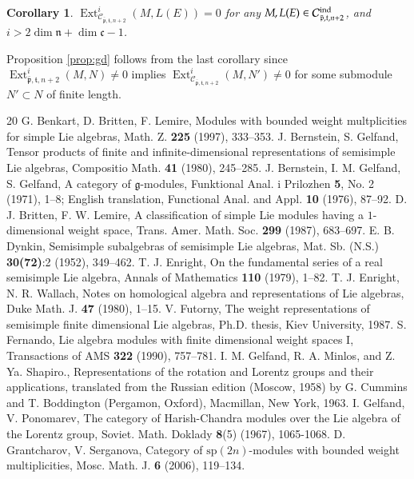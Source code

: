 \documentclass{tglat2e}
\newtheorem{corollary}[theorem]{Corollary}
\theoremstyle{definition}
\theoremstyle{remark}
\newcommand{\cc}{\mathfrak{c}}
\renewcommand{\tt}{\mathfrak{t}}
\newcommand{\nn}{\mathfrak{n}}
\newcommand{\pp}{\mathfrak{p}}
\renewcommand{\gg}{\mathfrak{g}}
\DeclareMathOperator{\Ext}{Ext}
\begin{document}
\begin{corollary} \label{cor:gd2}  $\Ext^i_{\mathcal{C}_{\bar{\pp},\tt,n+2}}(M,L(E))=0$ for any $M, L(E)\in \mathcal C^{\text{\rm ind}}_{\bar{\pp},\tt,n+2}$, and $i>2\dim\nn+\dim\cc -1$. 
\end{corollary}

Proposition \ref{prop:gd} follows from the last corollary since $\Ext^i_{\bar{\pp},\tt,n+2}(M,N)\neq 0$ implies $\Ext^i_{\mathcal{C}_{\bar{\pp},\tt,n+2}}(M,N')\neq 0$ for some submodule
$N'\subset N$ of finite length.

\begin{thebibliography}{20}
 G. Benkart, D. Britten, F. Lemire, {Modules with bounded weight multplicities for simple Lie algebras}, Math. Z. \textbf{225} (1997), 333--353.
 J. Bernstein, S. Gelfand,  Tensor products of finite
and infinite-dimensional representations
of semisimple Lie algebras, {Compositio Math.} \textbf{41}
(1980), 245--285.
 J. Bernstein, I. M. Gelfand, S. Gelfand, {A category of $\gg$-modules}, Funktional Anal. i Prilozhen {\bf5}, No. 2 (1971), 1--8; English translation, Functional Anal. and Appl. {\bf10} (1976), 87--92.
 D. J. Britten, F. W. Lemire, {A classification of simple Lie modules having a $1$-dimensional weight space}, Trans. Amer. Math. Soc. {\bf 299} (1987), 683--697.
 E. B. Dynkin, {Semisimple subalgebras of semisimple Lie algebras}, Mat. Sb. (N.S.) \textbf{30(72)}:2 (1952), 349--462.
 T. J. Enright, {On the fundamental series of a real semisimple Lie algebra}, Annals of Mathematics {\bf 110} (1979), 1--82.
 T. J. Enright, N. R. Wallach, {Notes on homological algebra and representations of Lie algebras}, Duke Math. J. \textbf{47} (1980), 1--15.
 V. Futorny, {The weight representations of semisimple finite dimensional Lie algebras}, Ph.D. thesis, Kiev University, 1987.
  S. Fernando, {Lie algebra modules with finite dimensional weight spaces I}, Transactions of AMS \textbf{322} (1990), 757--781.
 I. M. Gelfand, R. A. Minlos, and Z. Ya. Shapiro., {Representations of the rotation and Lorentz groups and their applications}, translated from the Russian edition (Moscow, 1958) by G. Cummins and T. Boddington (Pergamon, Oxford), Macmillan, New York, 1963.
 I. Gelfand, V. Ponomarev, {The category of Harish-Chandra modules over the Lie algebra of the Lorentz group}, Soviet. Math. Doklady {\bf 8}(5) (1967), 1065-1068.
 D. Grantcharov, V. Serganova, {Category of $\mathrm{sp}(2n)$-modules with bounded weight multiplicities}, Mosc. Math. J. {\bf 6} (2006), 119--134.

\end{thebibliography}
\end{document}
